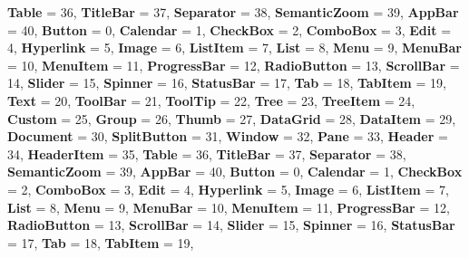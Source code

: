 \begin{DoxyCompactItemize}
{\bfseries Table} = 36, 
{\bfseries Title\+Bar} = 37, 
\newline
{\bfseries Separator} = 38, 
{\bfseries Semantic\+Zoom} = 39, 
{\bfseries App\+Bar} = 40, 
{\bfseries Button} = 0, 
\newline
{\bfseries Calendar} = 1, 
{\bfseries Check\+Box} = 2, 
{\bfseries Combo\+Box} = 3, 
{\bfseries Edit} = 4, 
\newline
{\bfseries Hyperlink} = 5, 
{\bfseries Image} = 6, 
{\bfseries List\+Item} = 7, 
{\bfseries List} = 8, 
\newline
{\bfseries Menu} = 9, 
{\bfseries Menu\+Bar} = 10, 
{\bfseries Menu\+Item} = 11, 
{\bfseries Progress\+Bar} = 12, 
\newline
{\bfseries Radio\+Button} = 13, 
{\bfseries Scroll\+Bar} = 14, 
{\bfseries Slider} = 15, 
{\bfseries Spinner} = 16, 
\newline
{\bfseries Status\+Bar} = 17, 
{\bfseries Tab} = 18, 
{\bfseries Tab\+Item} = 19, 
{\bfseries Text} = 20, 
\newline
{\bfseries Tool\+Bar} = 21, 
{\bfseries Tool\+Tip} = 22, 
{\bfseries Tree} = 23, 
{\bfseries Tree\+Item} = 24, 
\newline
{\bfseries Custom} = 25, 
{\bfseries Group} = 26, 
{\bfseries Thumb} = 27, 
{\bfseries Data\+Grid} = 28, 
\newline
{\bfseries Data\+Item} = 29, 
{\bfseries Document} = 30, 
{\bfseries Split\+Button} = 31, 
{\bfseries Window} = 32, 
\newline
{\bfseries Pane} = 33, 
{\bfseries Header} = 34, 
{\bfseries Header\+Item} = 35, 
{\bfseries Table} = 36, 
\newline
{\bfseries Title\+Bar} = 37, 
{\bfseries Separator} = 38, 
{\bfseries Semantic\+Zoom} = 39, 
{\bfseries App\+Bar} = 40, 
\newline
{\bfseries Button} = 0, 
{\bfseries Calendar} = 1, 
{\bfseries Check\+Box} = 2, 
{\bfseries Combo\+Box} = 3, 
\newline
{\bfseries Edit} = 4, 
{\bfseries Hyperlink} = 5, 
{\bfseries Image} = 6, 
{\bfseries List\+Item} = 7, 
\newline
{\bfseries List} = 8, 
{\bfseries Menu} = 9, 
{\bfseries Menu\+Bar} = 10, 
{\bfseries Menu\+Item} = 11, 
\newline
{\bfseries Progress\+Bar} = 12, 
{\bfseries Radio\+Button} = 13, 
{\bfseries Scroll\+Bar} = 14, 
{\bfseries Slider} = 15, 
\newline
{\bfseries Spinner} = 16, 
{\bfseries Status\+Bar} = 17, 
{\bfseries Tab} = 18, 
{\bfseries Tab\+Item} = 19, 

\end{DoxyCompactItemize}
